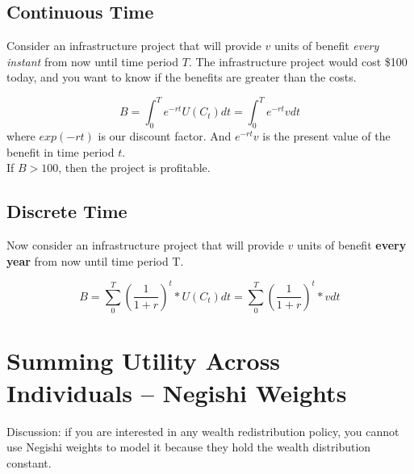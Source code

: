 \documentclass{article}
\begin{document}
\subsection{Continuous Time}
Consider an infrastructure project that will provide $v$ units of benefit \textit{every instant} from now until time period $T$. The infrastructure project would cost \$100 today, and you want to know if the benefits are greater than the costs. 

$$B = \int_0^T e^{-rt} U(C_t) dt  = \int_0^T e^{-rt} v dt$$
where $exp(-rt)$ is our discount factor. And $e^{-rt} v$ is the present value of the benefit in time period $t$. \\

If $B > 100$, then the project is profitable.

\subsection{Discrete Time}

Now consider an infrastructure project that will provide $v$ units of benefit \textbf{every year} from now until time period T. 

$$B = \sum_0^T (\frac{1}{1+r})^t * U(C_t) dt  = \sum_0^T (\frac{1}{1+r})^t * v dt$$

\section{Summing Utility Across Individuals -- Negishi Weights}
Discussion: if you are interested in any wealth redistribution policy, you cannot use Negishi weights to model it because they hold the wealth distribution constant. 
\end{document}
